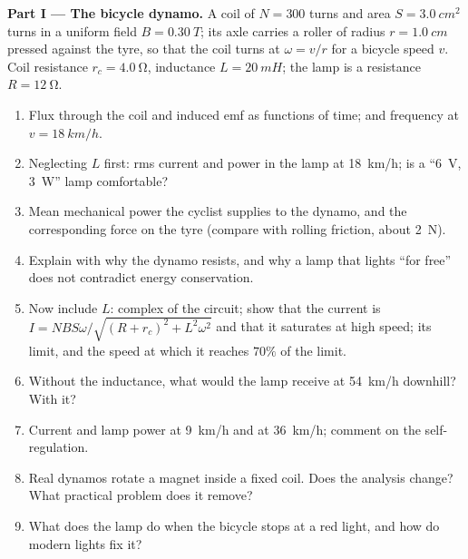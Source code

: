 \begin{problem}
\label{pb:b1:induction:1}

\medskip
\noindent\textbf{Part I --- The bicycle dynamo.}
A coil of $N = 300$ turns and area $S = \qty{3.0}{cm^2}$ turns in a
uniform field $B = \qty{0.30}{T}$; its axle carries a roller of radius
$r = \qty{1.0}{cm}$ pressed against the tyre, so that the coil turns at
$\omega = v/r$ for a bicycle speed $v$. Coil resistance $r_c = \qty{4.0}{\ohm}$,
inductance $L = \qty{20}{mH}$; the lamp is a resistance $R = \qty{12}{\ohm}$.
\begin{enumerate}
  \item Flux through the coil and induced emf as functions of time;
         and frequency at $v = \qty{18}{km/h}$.
  \item Neglecting $L$ first: rms current and power in the lamp at
        \qty{18}{km/h}; is a ``\qty{6}{V}, \qty{3}{W}'' lamp comfortable?
  \item Mean mechanical power the cyclist supplies to the dynamo, and
        the corresponding force on the tyre (compare with rolling
        friction, about \qty{2}{N}).
  \item Explain with  why the dynamo resists, and why a lamp
        that lights ``for free'' does not contradict energy conservation.
  \item Now include $L$: complex  of the circuit; show that
        the current  is $I = NBS\omega/\sqrt{(R + r_c)^2 + L^2\omega^2}$
        and that it saturates at high speed; its limit, and the
        speed at which it reaches $70\%$ of the limit.
  \item Without the inductance, what would the lamp receive at
        \qty{54}{km/h} downhill? With it?
  \item Current and lamp power at \qty{9}{km/h} and at \qty{36}{km/h}; comment
        on the self-regulation.
  \item Real dynamos rotate a magnet inside a fixed coil. Does the
        analysis change? What practical problem does it remove?
  \item What does the lamp do when the bicycle stops at a red light,
        and how do modern lights fix it?
\end{enumerate}


\end{problem}
